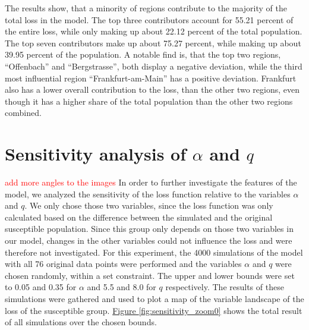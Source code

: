 The results show, that a minority of regions contribute to the majority of the total loss in the model. The top three contributors
account for 55.21 percent of the entire loss, while only making up about 22.12 percent of the total population. The top seven
contributors make up about 75.27 percent, while making up about 39.95 percent of the population. A notable find is, that the
top two regions, ``Offenbach'' and ``Bergstrasse'', both display a negative deviation, while the third most influential region
``Frankfurt-am-Main'' has a positive deviation. Frankfurt also has a lower overall contribution to the loss, than the other
two regions, even though it has a higher share of the total population than the other two regions combined.


\section{Sensitivity analysis of $\alpha$ and $q$}
\textcolor{red}{add more angles to the images}
In order to further investigate the features of the model, we analyzed the sensitivity of the loss function relative to
the variables $\alpha$ and $q$. We only chose those two variables, since the loss function was only calculated based
on the difference between the simulated and the original susceptible population. Since this group only depends on those
two variables in our model, changes in the other variables could not influence the loss and were therefore not investigated.
For this experiment, the 4000 simulations of the model with all 76 original data points were performed and the variables
$\alpha$ and $q$ were chosen randomly, within a set constraint. The upper and lower bounds were set to 0.05 and 0.35 for 
$\alpha$ and 5.5 and 8.0 for $q$ respectively. The results of these simulations were gathered and used to plot a map
of the variable landscape of the loss of the susceptible group.
\hyperref[fig:sensitivity_zoom0]{Figure \ref*{fig:sensitivity_zoom0}} shows the total result of all simulations over the
chosen bounds.

